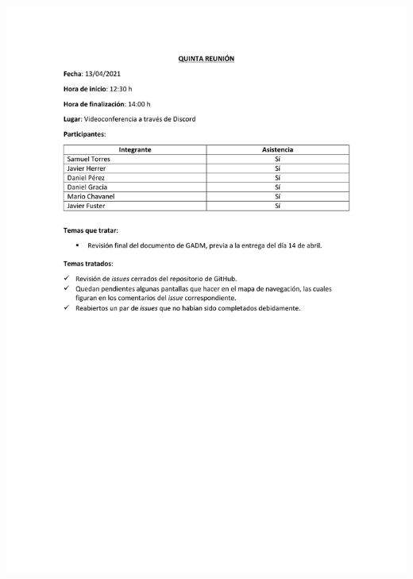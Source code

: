 \documentclass{article}
\begin{document}
\includegraphics[width=\textwidth]{../images/actas/Acta_reunion_5.pdf}
\end{document}
